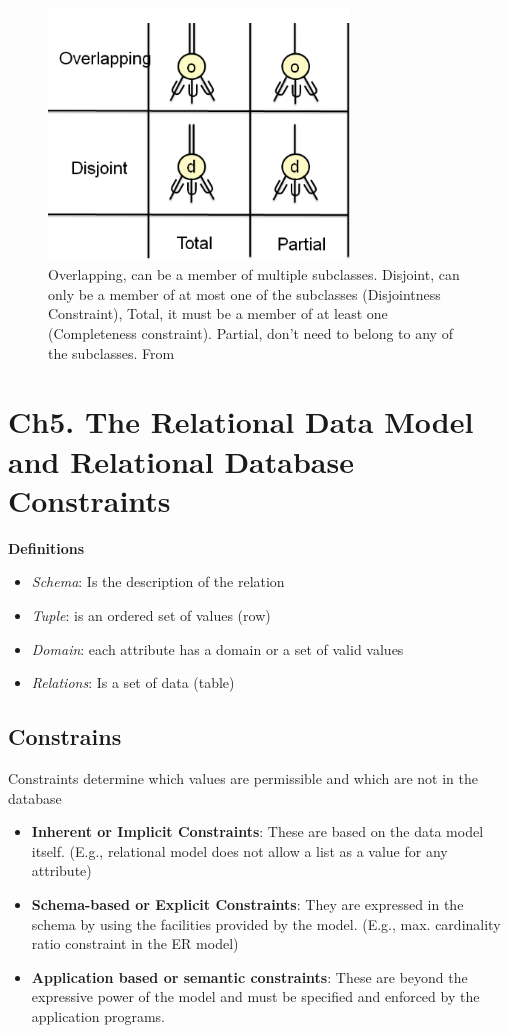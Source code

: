 \begin{multicols}{2}
\begin{figure}[H]
    \centering
    \includegraphics[width=8cm]{image/constraints_specialization-generalization.png}
    \caption{Overlapping, can be a member of multiple subclasses. Disjoint, can only be a member of at most one of the subclasses (Disjointness Constraint),  Total, it must be a member of at least one (Completeness constraint). Partial, don't need to belong to any of the subclasses. From \cite{}}
\end{figure}


\section{Ch5. The Relational Data Model and Relational Database Constraints}
\noindent\textbf{Definitions}
\begin{itemize}
    \item \textit{Schema}: Is the description of the relation
    \item \textit{Tuple}: is an ordered set of values (row)
    \item \textit{Domain}: each attribute has a domain or a set of valid values
    \item \textit{Relations}: Is a set of data (table)
\end{itemize}

\subsection{Constrains}
Constraints determine which values are permissible and 
which are not in the database
\begin{itemize}
    \item \textbf{Inherent or Implicit Constraints}: These are based on the data model itself. (E.g., relational model does not allow a list as a value for any attribute)
    \item \textbf{Schema-based or Explicit Constraints}: They are expressed in the schema by using the facilities provided by the model. (E.g., max. cardinality ratio constraint in the ER model) 
    \item \textbf{Application based or semantic constraints}: These are beyond the expressive power of the model and must be specified and enforced by the application programs. 
\end{itemize}


\end{multicols}
